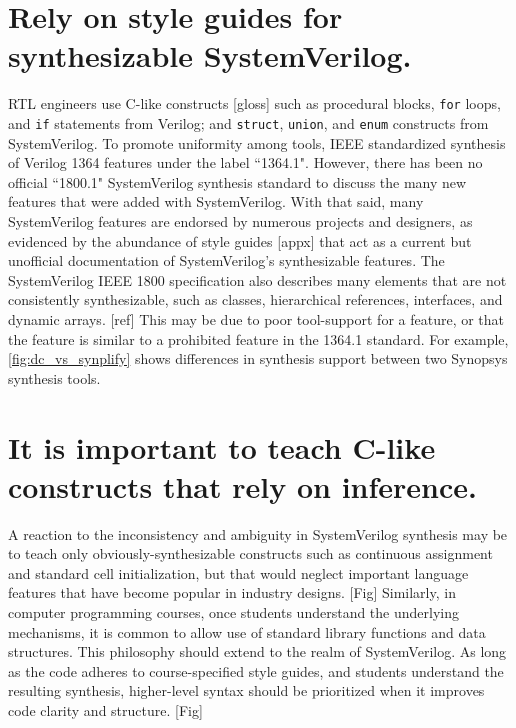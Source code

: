 \section{Rely on style guides for synthesizable SystemVerilog.}

\begin{figure}[t]

\end{figure}

RTL engineers use C-like constructs [gloss] such as procedural blocks, \texttt{for} loops, and \texttt{if} statements from Verilog; and \texttt{struct}, \texttt{union}, and \texttt{enum} constructs from SystemVerilog. To promote uniformity among tools, IEEE standardized synthesis of Verilog 1364 features under the label ``1364.1". However, there has been no official ``1800.1" SystemVerilog synthesis standard to discuss the many new features that were added with SystemVerilog. With that said, many SystemVerilog features are endorsed by numerous projects and designers, as evidenced by the abundance of style guides [appx] that act as a current but unofficial documentation of SystemVerilog's synthesizable features. The SystemVerilog IEEE 1800 specification also describes many elements that are not consistently synthesizable, such as classes, hierarchical references, interfaces, and dynamic arrays. [ref] This may be due to poor tool-support for a feature, or that the feature is similar to a prohibited feature in the 1364.1 standard. For example, \autoref{fig:dc_vs_synplify} shows differences in synthesis support between two Synopsys synthesis tools.

\section{It is important to teach C-like constructs that rely on inference.}

A reaction to the inconsistency and ambiguity in SystemVerilog synthesis may be to teach only obviously-synthesizable constructs such as continuous assignment and standard cell initialization, but that would neglect important language features that have become popular in industry designs. [Fig] Similarly, in computer programming courses, once students understand the underlying mechanisms, it is common to allow use of standard library functions and data structures. This philosophy should extend to the realm of SystemVerilog. As long as the code adheres to course-specified style guides, and students understand the resulting synthesis, higher-level syntax should be prioritized when it improves code clarity and structure. [Fig]

